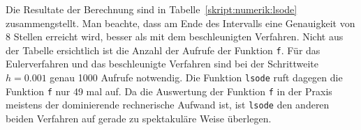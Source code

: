 Die Resultate der Berechnung sind in Tabelle~\ref{skript:numerik:lsode}
zusammengstellt.
Man beachte, dass am Ende des Intervalls eine Genauigkeit von
8 Stellen erreicht wird, besser als mit dem beschleunigten
Verfahren.
Nicht aus der Tabelle ersichtlich ist die Anzahl der Aufrufe der
Funktion \texttt{f}.
Für das Eulerverfahren und das beschleunigte Verfahren sind bei
der Schrittweite $h=0.001$ genau 1000 Aufrufe notwendig.
Die Funktion \texttt{lsode} ruft dagegen die Funktion \texttt{f}
nur 49 mal auf.
Da die Auswertung der Funktion \texttt{f} in der Praxis meistens
der dominierende rechnerische Aufwand ist, ist \texttt{lsode}
den anderen beiden Verfahren auf gerade zu spektakuläre Weise überlegen.








